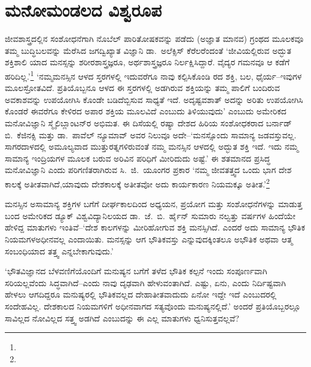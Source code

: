 \section*{ಮನೋಮಂಡಲದ ವಿಶ್ವರೂಪ}

\vskip 0.5pt

ಜೀವಶಾಸ್ತ್ರದಲ್ಲಿನ ಸಂಶೋಧನೆಗಾಗಿ ನೊಬೆಲ್ ಪಾರಿತೋಷಕವನ್ನು ಪಡೆದು (ಅಜ್ಞಾತ ಮಾನವ) ಗ್ರಂಥದ ಮೂಲಕವೂ ತಮ್ಮ ಬುದ್ಧಿಬಲವನ್ನು ಮೆರೆಸಿದ ಜಗದ್ವಿಖ್ಯಾತ ವಿಜ್ಞಾನಿ ಡಾ.\ ಅಲೆಕ್ಸಿಸ್ ಕೆರೆಲರೆಂದಂತೆ ‘ಜೀವಿಯಲ್ಲಿರುವ ಅದ್ಭುತ ಶಕ್ತಿಶಾಲಿ ಯಾದ ಮನಸ್ಸನ್ನು ಶರೀರಶಾಸ್ತ್ರಜ್ಞರೂ, ಅರ್ಥಶಾಸ್ತ್ರಜ್ಞರೂ ನಿರ್ಲಕ್ಷಿಸಿದ್ದಾರೆ. ವೈದ್ಯರ ಗಮನವೂ ಆ ಕಡೆಗೆ ಹರಿದಿಲ್ಲ.’\footnote{\hfill{}} ‘ನಮ್ಮಮನಸ್ಸಿನ ಆಳದ ಸ್ತರಗಳಲ್ಲಿ ಇದುವರೆಗೂ ನಾವು ಕಲ್ಪಿಸಿಕೊಂಡಿ ರದ ಶಕ್ತಿ, ಬಲ, ಧೈರ್ಯ–ಇವುಗಳ ಮೂಲಸ್ರೋತವಿದೆ. ಪ್ರತಿಯೊಬ್ಬನೂ ಆಳದ ಈ ಸ್ತರಗಳಲ್ಲಿ ಅಡಗಿರುವ ಶಕ್ತಿಯನ್ನು ತಮ್ಮ ಪಾಲಿಗೆ ಬಂದಿರುವ ಅವಕಾಶವನ್ನು ಉಪಯೋಗಿಸಿ ಕೊಂಡೇ ಬಡಿದೆಬ್ಬಿಸುವ ಸಾಧ್ಯತೆ ಇದೆ. ಅದೃಷ್ಟವಶಾತ್ ಅದನ್ನು ಅರಿತು ಉಪಯೋಗಿಸಿ ಕೊಂಡರೆ ಈವರೆಗೂ ಕೇಳಿರದ ಅಪಾರ ಶಕ್ತಿಯ ಮೂಲವಿದೆ ಎಂಬುದು ತಿಳಿಯುವುದು’ ಎಂಬುದು ಅಮೇರಿಕದ ಮನೋವಿಜ್ಞಾನಿ ಸ್ಮೈಲಿ\break ಬ್ಲಾಂಟನ್​ರ ಅಭಿಮತ. ಈ ದಿಸೆಯಲ್ಲಿ ರಷ್ಯಾ ದೇಶದ ಹಿರಿಯ ಸಂಶೋಧಕರಾದ ಬರ್ನಾಡ್ ಬಿ.\ ಕೆಜಿನಕ್ಸಿ ಮತ್ತು ಡಾ.\ ಪಾವೆಲ್ ನ್ಯೂಮಾವ್ ಅವರ ನಿಲುವೂ ಅದೇ–‘ಮನಸ್ಸೊಂದು ಸಾಮಾನ್ಯ ಜಡವಸ್ತುವಲ್ಲ. ಸಾಗರದಾಳದಲ್ಲಿ ಅಮೂಲ್ಯವಾದ ಮುತ್ತುರತ್ನಗಳಿರುವಂತೆ ನಮ್ಮ ಮನಸ್ಸಿನ ಆಳದಲ್ಲಿ ಅದ್ಭುತ ಶಕ್ತಿ ಇದೆ. ಇದು ನಮ್ಮ ಸಾಮಾನ್ಯ ಇಂದ್ರಿಯಗಳ ಮೂಲಕ ಬರುವ ಅರಿವಿನ ಪರಿಧಿಗೆ ಮೀರಿದುದು ಅಷ್ಟೆ.’ ಈ ಶತಮಾನದ ಪ್ರಸಿದ್ಧ ಮನೋವಿಜ್ಞಾನಿ ಎಂದು ಪರಿಗಣಿತರಾಗಿರುವ ಸಿ.\ ಜಿ.\ ಯೂಂಗರ ಪ್ರಕಾರ ‘ನಮ್ಮ ಜೀವತತ್ತ್ವದ ಒಂದು ಭಾಗ ದೇಶ ಕಾಲಕ್ಕೆ ಅತೀತವಾಗಿದೆ,\break ಯಾವುದು ದೇಶಕಾಲಕ್ಕೆ ಅತೀತವೋ ಅದು ಕಾರ್ಯಕಾರಣ ನಿಯಮಕ್ಕೂ ಅತೀತ.’\footnote{\hfill{}}

\vskip 2pt

ಮನಸ್ಸಿನ ಅಸಾಮಾನ್ಯ ಶಕ್ತಿಗಳ ಬಗೆಗೆ ದೀರ್ಘಕಾಲದಿಂದ ಅಧ್ಯಯನ, ಪ್ರಯೋಗ ಮತ್ತು ಸಂಶೋಧನೆಗಳನ್ನು ಮಾಡುತ್ತ ಬಂದ ಅಮೇರಿಕದ ಡ್ಯೂಕ್ ವಿಶ್ವವಿದ್ಯಾನಿಲಯದ ಡಾ.\ ಜೆ.\ ಬಿ.\ ರ್ಹೈನ್ ಸುಮಾರು ನಲ್ವತ್ತು ವರ್ಷಗಳ ಹಿಂದೆಯೇ ಹೇಳಿದ್ದ ಮಾತುಗಳು ಇಂತಿವೆ–‘ದೇಶ ಕಾಲಗಳನ್ನು ಮೀರಿಹೋಗುವ ಶಕ್ತಿ ಮನಸ್ಸಿಗಿದೆ. ಎಂದರೆ ಅದು ಸಾಮಾನ್ಯ ಭೌತಿಕ ನಿಯಮಗಳ\break ಅಧೀನವಲ್ಲ ಎಂದಾಯಿತು. ಮನಸ್ಸನ್ನು ಆಗ ಭೌತಿಕವಸ್ತು ಎನ್ನುವುದಕ್ಕಿಂತಲೂ ಅಭೌತಿಕ ಅಥವಾ ಆತ್ಮ ಸಂಬಂಧಿಯಾದ ತತ್ತ್ವ ಎನ್ನಬೇಕಾಗುವುದು.’

‘ಭೌತವಿಜ್ಞಾನದ ಬೆಳವಣಿಗೆಯೊಂದಿಗೆ ಮನುಷ್ಯನ ಬಗೆಗೆ ತಳೆದ ಭೌತಿಕ ಕಲ್ಪನೆ ಇಂದು ಸಂಪೂರ್ಣವಾಗಿ ಸರಿಯಲ್ಲವೆಂದು ಸಿದ್ಧವಾಗಿದೆ–ಎಂದು ನಾವು ದೃಢವಾಗಿ ಹೇಳುವಂತಾಗಿದೆ. ಎಷ್ಟು, ಏನು, ಎಂದು ನಿರ್ದಿಷ್ಟವಾಗಿ ಹೇಳಲು ಆಗದಿದ್ದರೂ ಮನುಷ್ಯರಲ್ಲಿ ಭೌತಿಕವಲ್ಲದ ದೇಹಾತೀತವಾದುದು ಏನೋ ಇದ್ದೇ ಇದೆ ಎಂಬುದರಲ್ಲಿ ಸಂದೇಹವಿಲ್ಲ. ದೇಶಕಾಲದ ನಿಯಮಗಳಿಗೆ ಅಧೀನವಾಗದ ಸತ್ಯವೊಂದು ಮನುಷ್ಯನಲ್ಲಿದೆ.’ ಅಂದರೆ ಪ್ರತಿಯೊಬ್ಬರಲ್ಲೂ ಸಾವಿಲ್ಲದ ನೋವಿಲ್ಲದ ಸತ್ತ್ವ ಅಡಗಿದೆ ಎಂಬುದನ್ನು ಈ ಎಲ್ಲ ಮಾತುಗಳು ಧ್ವನಿಸುತ್ತವಲ್ಲವೆ?

